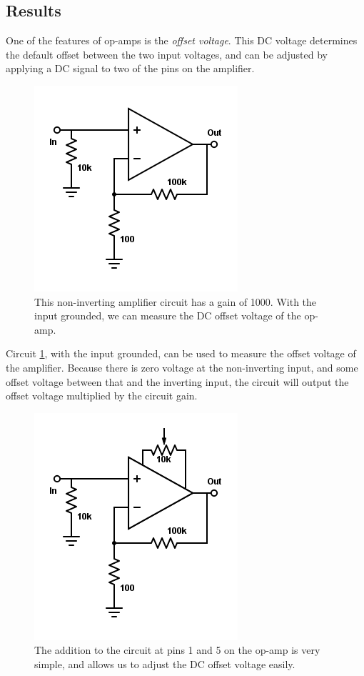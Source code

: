 \documentclass[11pt]{article}
\begin{document}
\subsection{Results}

One of the features of op-amps is the \emph{offset voltage}. This DC voltage determines the default offset between the two input voltages, and can be adjusted by applying a DC signal to two of the pins on the amplifier. 

\begin{figure}[H]
    \centering
    \includegraphics[scale=0.5]{Diagrams/c-b1.png}
    \caption{This non-inverting amplifier circuit has a gain of 1000. With the input grounded, we can measure the DC offset voltage of the op-amp.}
    \label{circuit:b1}
\end{figure}

Circuit \ref{circuit:b1}, with the input grounded, can be used to measure the offset voltage of the amplifier. Because there is zero voltage at the non-inverting input, and some offset voltage between that and the inverting input, the circuit will output the offset voltage multiplied by the circuit gain.

\begin{figure}[H]
    \centering
    \includegraphics[scale=0.5]{Diagrams/c-b2.png}
    \caption{The addition to the circuit at pins 1 and 5 on the op-amp is very simple, and allows us to adjust the DC offset voltage easily.}
    \label{circuit:b2}
\end{figure}
\end{document}
